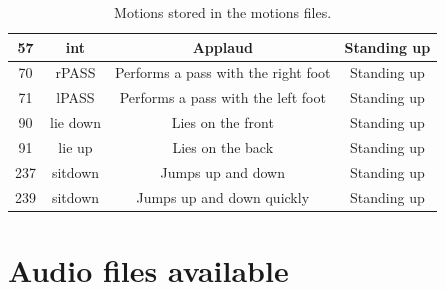 \documentclass[a4paper, 12pt]{article}  		%
\begin{document}
\begin{table}[H]
\begin{center}
\begin{tabular}{ | c | c | c | c | }
\hline
57 & int & Applaud & Standing up \\
\hline
70 & rPASS & Performs a pass with the right foot & Standing up \\
\hline
71 & lPASS & Performs a pass with the left foot & Standing up \\
\hline
90 & lie down & Lies on the front & Standing up \\
\hline
91 & lie up & Lies on the back & Standing up \\
\hline
237 & sitdown & Jumps up and down & Standing up \\
\hline
239 & sitdown & Jumps up and down quickly & Standing up \\
\hline
\end{tabular}
\caption{Motions stored in the motions files.}
\label{tab::Motions}
\end{center}
\end{table}


\section{Audio files available} \label{sec:audioFile}
\end{document}
